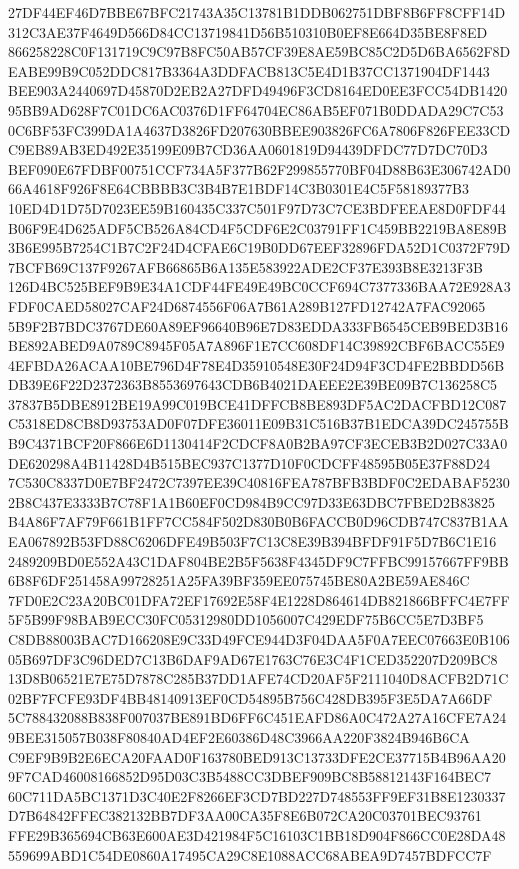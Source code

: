 \documentclass[UTF8,fontset=fandol,zihao=-4,a4paper]{ctexart}
\begin{document}
{{27DF44EF46D7BBE67BFC21743A35C13781B1DDB062751DBF8B6FF8CFF14D312C3AE37F4649D566D84CC13719841D56B510310B0EF8E664D35BE8F8ED
866258228C0F131719C9C97B8FC50AB57CF39E8AE59BC85C2D5D6BA6562F8DEABE99B9C052DDC817B3364A3DDFACB813C5E4D1B37CC1371904DF1443
BEE903A2440697D45870D2EB2A27DFD49496F3CD8164ED0EE3FCC54DB142095BB9AD628F7C01DC6AC0376D1FF64704EC86AB5EF071B0DDADA29C7C53
0C6BF53FC399DA1A4637D3826FD207630BBEE903826FC6A7806F826FEE33CDC9EB89AB3ED492E35199E09B7CD36AA0601819D94439DFDC77D7DC70D3
BEF090E67FDBF00751CCF734A5F377B62F299855770BF04D88B63E306742AD066A4618F926F8E64CBBBB3C3B4B7E1BDF14C3B0301E4C5F58189377B3
10ED4D1D75D7023EE59B160435C337C501F97D73C7CE3BDFEEAE8D0FDF44B06F9E4D625ADF5CB526A84CD4F5CDF6E2C03791FF1C459BB2219BA8E89B
3B6E995B7254C1B7C2F24D4CFAE6C19B0DD67EEF32896FDA52D1C0372F79D7BCFB69C137F9267AFB66865B6A135E583922ADE2CF37E393B8E3213F3B
126D4BC525BEF9B9E34A1CDF44FE49E49BC0CCF694C7377336BAA72E928A3FDF0CAED58027CAF24D6874556F06A7B61A289B127FD12742A7FAC92065
5B9F2B7BDC3767DE60A89EF96640B96E7D83EDDA333FB6545CEB9BED3B16BE892ABED9A0789C8945F05A7A896F1E7CC608DF14C39892CBF6BACC55E9
4EFBDA26ACAA10BE796D4F78E4D35910548E30F24D94F3CD4FE2BBDD56BDB39E6F22D2372363B8553697643CDB6B4021DAEEE2E39BE09B7C136258C5
37837B5DBE8912BE19A99C019BCE41DFFCB8BE893DF5AC2DACFBD12C087C5318ED8CB8D93753AD0F07DFE36011E09B31C516B37B1EDCA39DC245755B
B9C4371BCF20F866E6D1130414F2CDCF8A0B2BA97CF3ECEB3B2D027C33A0DE620298A4B11428D4B515BEC937C1377D10F0CDCFF48595B05E37F88D24
7C530C8337D0E7BF2472C7397EE39C40816FEA787BFB3BDF0C2EDABAF52302B8C437E3333B7C78F1A1B60EF0CD984B9CC97D33E63DBC7FBED2B83825
B4A86F7AF79F661B1FF7CC584F502D830B0B6FACCB0D96CDB747C837B1AAEA067892B53FD88C6206DFE49B503F7C13C8E39B394BFDF91F5D7B6C1E16
2489209BD0E552A43C1DAF804BE2B5F5638F4345DF9C7FFBC99157667FF9BB6B8F6DF251458A99728251A25FA39BF359EE075745BE80A2BE59AE846C
7FD0E2C23A20BC01DFA72EF17692E58F4E1228D864614DB821866BFFC4E7FF5F5B99F98BAB9ECC30FC05312980DD1056007C429EDF75B6CC5E7D3BF5
C8DB88003BAC7D166208E9C33D49FCE944D3F04DAA5F0A7EEC07663E0B10605B697DF3C96DED7C13B6DAF9AD67E1763C76E3C4F1CED352207D209BC8
13D8B06521E7E75D7878C285B37DD1AFE74CD20AF5F2111040D8ACFB2D71C02BF7FCFE93DF4BB48140913EF0CD54895B756C428DB395F3E5DA7A66DF
5C788432088B838F007037BE891BD6FF6C451EAFD86A0C472A27A16CFE7A249BEE315057B038F80840AD4EF2E60386D48C3966AA220F3824B946B6CA
C9EF9B9B2E6ECA20FAAD0F163780BED913C13733DFE2CE37715B4B96AA209F7CAD46008166852D95D03C3B5488CC3DBEF909BC8B58812143F164BEC7
60C711DA5BC1371D3C40E2F8266EF3CD7BD227D748553FF9EF31B8E1230337D7B64842FFEC382132BB7DF3AA00CA35F8E6B072CA20C03701BEC93761
FFE29B365694CB63E600AE3D421984F5C16103C1BB18D904F866CC0E28DA48559699ABD1C54DE0860A17495CA29C8E1088ACC68ABEA9D7457BDFCC7F
}}
\end{document}
